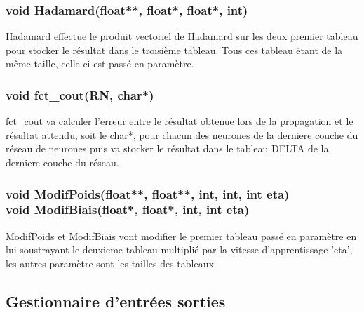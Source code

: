 \documentclass{article}
\begin{document}
			\subsubsection{\textcolor{myblue}{\textbf{void}} Hadamard(\textcolor{myblue}{\textbf{float**}},  \textcolor{myblue}{\textbf{float*}},  \textcolor{myblue}{\textbf{float*}},  \textcolor{myblue}{\textbf{int}})}
				Hadamard effectue le produit vectoriel de Hadamard sur les deux premier tableau pour stocker le résultat dans le troisième tableau. Tous ces tableau étant de la même taille, celle ci est passé en paramètre.
				
			\subsubsection{\textcolor{myblue}{\textbf{void}} fct\_cout(\textcolor{myblue}{\textbf{RN}}, \textcolor{myblue}{\textbf{char*}})}
			 fct\_cout va calculer l'erreur entre le résultat obtenue lors de la propagation et le résultat attendu, soit le char*, pour chacun des neurones de la derniere couche du réseau de neurones puis va stocker le résultat dans le tableau DELTA de la derniere couche du réseau.
			
			\subsubsection{\textcolor{myblue}{\textbf{void}} ModifPoids(\textcolor{myblue}{\textbf{float**}},  \textcolor{myblue}{\textbf{float**}},  \textcolor{myblue}{\textbf{int}},  \textcolor{myblue}{\textbf{int}},  \textcolor{myblue}{\textbf{int}} eta)\\
			\textcolor{myblue}{\textbf{void}} ModifBiais(\textcolor{myblue}{\textbf{float*}},  \textcolor{myblue}{\textbf{float*}},  \textcolor{myblue}{\textbf{int}},  \textcolor{myblue}{\textbf{int}} eta)}
			ModifPoids et ModifBiais vont modifier le premier tableau passé en paramètre en lui soustrayant le deuxieme tableau multiplié par la vitesse d'apprentissage 'eta', les autres paramètre sont les tailles des tableaux
		
		
		
	\subsection{Gestionnaire d'entrées sorties}
\end{document}
